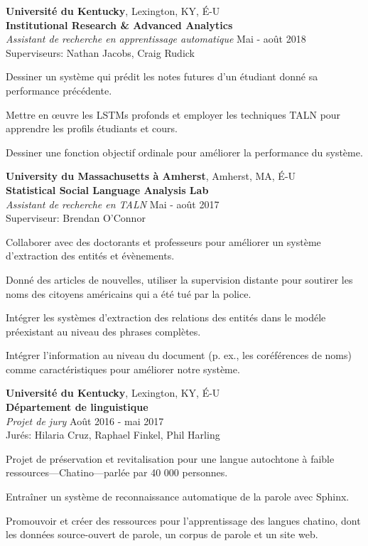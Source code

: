\documentclass[10pt]{article}
\newcommand{\halfblankline}{\quad\vspace{-0.5\baselineskip}\pagebreak[3]}
\begin{document}
	\halfblankline

	{\textbf{Université du Kentucky}},
	Lexington, KY, É-U\\
	\textbf{Institutional Research \& Advanced Analytics}\\
		\textit{Assistant de recherche en apprentissage automatique}
		\hfill Mai - août 2018\\
		Superviseurs: Nathan Jacobs, Craig Rudick
		\begin{innerlist}
			\item Dessiner un système qui prédit les notes futures d'un étudiant donné sa performance précédente.
			\item Mettre en œuvre les LSTMs profonds et employer les techniques TALN pour apprendre les profils étudiants et cours.
			\item Dessiner une fonction objectif ordinale pour améliorer la performance du système.
		\end{innerlist}

	\halfblankline

	{\textbf{University du Massachusetts à Amherst}},
	Amherst, MA, É-U\\
	\textbf{Statistical Social Language Analysis Lab}\\
		\textit{Assistant de recherche en TALN}%
		\hfill Mai - août 2017\\
		Superviseur: Brendan O'Connor
		\begin{innerlist}
			\item Collaborer avec des doctorants et professeurs pour améliorer un système d'extraction des entités et évènements.
			\item Donné des articles de nouvelles, utiliser la supervision distante pour soutirer les noms des citoyens américains qui a été tué par la police.
			\item Intégrer les systèmes d'extraction des relations des entités dans le modéle préexistant au niveau des phrases complètes.
			\item Intégrer l'information au niveau du document (p. ex., les coréférences de noms) comme caractéristiques pour améliorer notre système.
		\end{innerlist}
	
	\halfblankline
	
	{\textbf{Université du Kentucky}},
	Lexington, KY, É-U\\
	\textbf{Département de linguistique}\\
		\textit{Projet de jury}%
		\hfill Août 2016 - mai 2017\\
		Jurés: Hilaria Cruz, Raphael Finkel, Phil Harling
		\begin{innerlist}
			\item Projet de préservation et revitalisation pour une langue autochtone à faible ressources---Chatino---parlée par 40 000 personnes.
			\item Entraîner un système de reconnaissance automatique de la parole avec Sphinx.
			\item Promouvoir et créer des ressources pour l'apprentissage des langues chatino, dont les données source-ouvert de parole, un corpus de parole et un site web.
		\end{innerlist}
	
\end{document}

